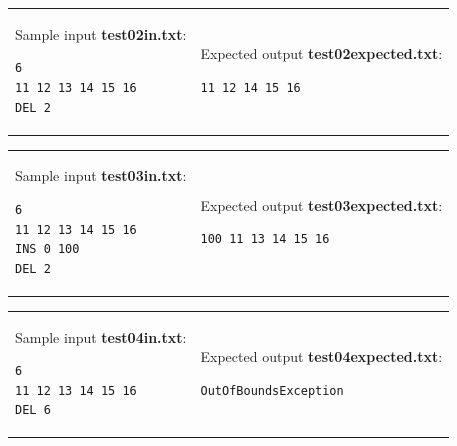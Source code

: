 \documentclass[11pt]{article}
\begin{document}
\vspace{10pt}
\begin{tabular}{@{}ll@{}}
\begin{minipage}[t]{0.49\columnwidth}
Sample input {\bf test02in.txt}:
\begin{verbatim}
6
11 12 13 14 15 16
DEL 2
\end{verbatim}
\end{minipage} 
&
\begin{minipage}[t]{0.49\columnwidth}
Expected output {\bf test02expected.txt}:
\begin{verbatim}
11 12 14 15 16
\end{verbatim}
\end{minipage} 
\end{tabular}



\vspace{10pt}
\begin{tabular}{@{}ll@{}}
\begin{minipage}[t]{0.49\columnwidth}
Sample input {\bf test03in.txt}:
\begin{verbatim}
6
11 12 13 14 15 16
INS 0 100
DEL 2
\end{verbatim}
\end{minipage} 
&
\begin{minipage}[t]{0.49\columnwidth}
Expected output {\bf test03expected.txt}:
\begin{verbatim}
100 11 13 14 15 16
\end{verbatim}
\end{minipage} 
\end{tabular}




\vspace{10pt}
\begin{tabular}{@{}ll@{}}
\begin{minipage}[t]{0.49\columnwidth}
Sample input {\bf test04in.txt}:
\begin{verbatim}
6
11 12 13 14 15 16
DEL 6
\end{verbatim}
\end{minipage} 
&
\begin{minipage}[t]{0.49\columnwidth}
Expected output {\bf test04expected.txt}:
\begin{verbatim}
OutOfBoundsException
\end{verbatim}
\end{minipage} 
\end{tabular}
\end{document}
